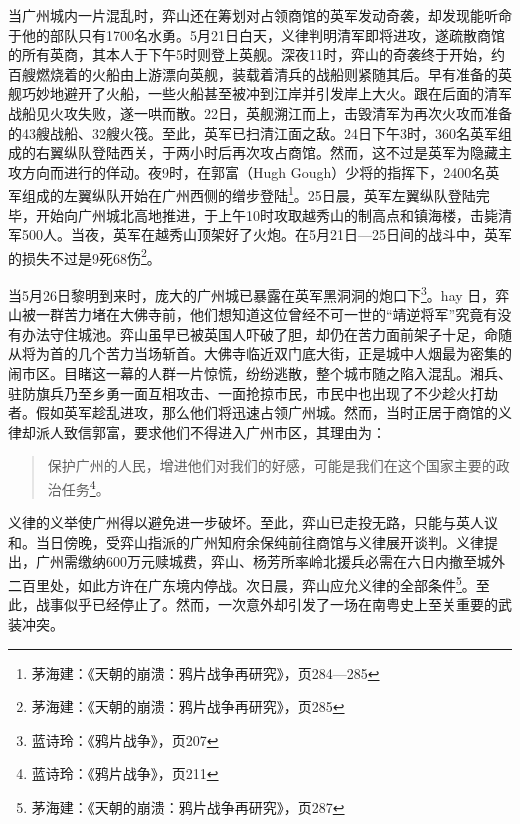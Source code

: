 当广州城内一片混乱时，弈山还在筹划对占领商馆的英军发动奇袭，却发现能听命于他的部队只有1700名水勇。5月21日白天，义律判明清军即将进攻，遂疏散商馆的所有英商，其本人于下午5时则登上英舰。深夜11时，弈山的奇袭终于开始，约百艘燃烧着的火船由上游漂向英舰，装载着清兵的战船则紧随其后。早有准备的英舰巧妙地避开了火船，一些火船甚至被冲到江岸并引发岸上大火。跟在后面的清军战船见火攻失败，遂一哄而散。22日，英舰溯江而上，击毁清军为再次火攻而准备的43艘战船、32艘火筏。至此，英军已扫清江面之敌。24日下午3时，360名英军组成的右翼纵队登陆西关，于两小时后再次攻占商馆。然而，这不过是英军为隐藏主攻方向而进行的佯动。夜9时，在郭富（Hugh Gough）少将的指挥下，2400名英军组成的左翼纵队开始在广州西侧的缯步登陆\footnote{茅海建：《天朝的崩溃：鸦片战争再研究》，页284—285}。25日晨，英军左翼纵队登陆完毕，开始向广州城北高地推进，于上午10时攻取越秀山的制高点和镇海楼，击毙清军500人。当夜，英军在越秀山顶架好了火炮。在5月21日—25日间的战斗中，英军的损失不过是9死68伤\footnote{茅海建：《天朝的崩溃：鸦片战争再研究》，页285}。

当5月26日黎明到来时，庞大的广州城已暴露在英军黑洞洞的炮口下\footnote{蓝诗玲：《鸦片战争》，页207}。hay 日，弈山被一群苦力堵在大佛寺前，他们想知道这位曾经不可一世的“靖逆将军”究竟有没有办法守住城池。弈山虽早已被英国人吓破了胆，却仍在苦力面前架子十足，命随从将为首的几个苦力当场斩首。大佛寺临近双门底大街，正是城中人烟最为密集的闹市区。目睹这一幕的人群一片惊慌，纷纷逃散，整个城市随之陷入混乱。湘兵、驻防旗兵乃至乡勇一面互相攻击、一面抢掠市民，市民中也出现了不少趁火打劫者。假如英军趁乱进攻，那么他们将迅速占领广州城。然而，当时正居于商馆的义律却派人致信郭富，要求他们不得进入广州市区，其理由为：

\begin{quote}

保护广州的人民，增进他们对我们的好感，可能是我们在这个国家主要的政治任务\footnote{蓝诗玲：《鸦片战争》，页211}。

\end{quote}

义律的义举使广州得以避免进一步破坏。至此，弈山已走投无路，只能与英人议和。当日傍晚，受弈山指派的广州知府余保纯前往商馆与义律展开谈判。义律提出，广州需缴纳600万元赎城费，弈山、杨芳所率岭北援兵必需在六日内撤至城外二百里处，如此方许在广东境内停战。次日晨，弈山应允义律的全部条件\footnote{茅海建：《天朝的崩溃：鸦片战争再研究》，页287}。至此，战事似乎已经停止了。然而，一次意外却引发了一场在南粤史上至关重要的武装冲突。

